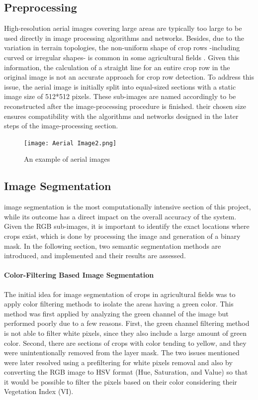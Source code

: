 \documentclass[conference]{IEEEtran}
\begin{document}
\subsection{Preprocessing}\label{Preprocessing}
High-resolution aerial images covering large areas are typically too large to be used directly in image processing algorithms and networks. Besides, due to the variation in terrain topologies, the non-uniform shape of crop rows -including curved or irregular shapes- is common in some agricultural fields
\cite{b2, b3, b14}.
Given this information, the calculation of a straight line for an entire crop row in the original image is not an accurate approach for crop row detection.
To address this issue, the aerial image is initially split into equal-sized sections with a static image size of 512*512 pixels. These sub-images are named accordingly to be reconstructed after the image-processing procedure is finished. their chosen size ensures compatibility with the algorithms and networks designed in the later steps of the image-processing section.


\begin{figure}[htbp]
\texttt{[image: Aerial Image2.png]}
\caption{An example of aerial images}
\label{fig1}
\end{figure}

\subsection{Image Segmentation}\label{Image Segmentation}
image segmentation is the most computationally intensive section of this project, while its outcome has a direct impact on the overall accuracy of the system. Given the RGB sub-images, it is important to identify the exact locations where crops exist, which is done by processing the image and generation of a binary mask. In the following section, two semantic segmentation methods are introduced, and implemented and their results are assessed.

\paragraph{Color-Filtering Based Image Segmentation}
The initial idea for image segmentation of crops in agricultural fields was to apply color filtering methods to isolate the areas having a green color. This method was first applied by analyzing the green channel of the image but performed poorly due to a few reasons. First, the green channel filtering method is not able to filter white pixels, since they also include a large amount of green color. Second, there are sections of crops with color tending to yellow, and they were unintentionally removed from the layer mask. The two issues mentioned were later resolved using a prefiltering for white pixels removal and also by converting the RGB image to HSV format (Hue, Saturation, and Value) so that it would be possible to filter the pixels based on their color considering their Vegetation Index (VI). 
\end{document}
